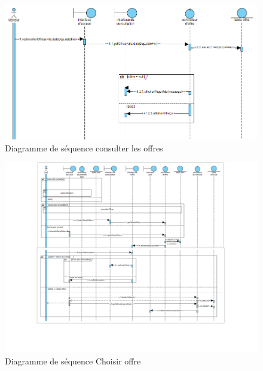 \newpage
\begin{figure}[p]

\centering
\includegraphics[width=1.3\textwidth, angle =90 ]{33.PNG}
\caption{Diagramme de séquence consulter les offres}
\label{fig:awesome_image}

\end{figure}
\newpage
\begin{figure}[p]

\centering
\includegraphics[width=1.3\textwidth, angle =90 ]{111.png}
\caption{Diagramme de séquence Choisir offre}
\label{fig:awesome_image}

\end{figure}
\newpage





